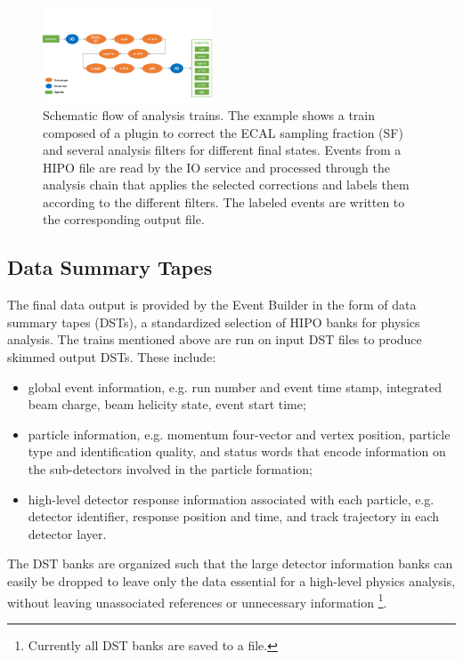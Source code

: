 \begin{figure}
    \includegraphics[width=0.45\textwidth,height=0.2\textheight]{pics/train.pdf}
    \caption{Schematic flow of analysis trains. The example shows a train composed of a plugin to correct the ECAL
      sampling fraction (SF) and several analysis filters for different final states. Events from a HIPO file are read
      by the IO service and processed through the analysis chain that applies the selected corrections and labels them
      according to the different filters. The labeled events are written to the corresponding output file.\label{fig:train}}
\end{figure}

\subsection{Data Summary Tapes}
\label{sec:dsts}

The final data output is provided by the Event Builder in the form of data summary tapes (DSTs), a standardized
selection of HIPO banks for physics analysis. The trains mentioned above are run on input DST files to produce
skimmed output DSTs. These include:

\begin{itemize}
\item global event information, e.g. run number and event time stamp, integrated beam charge, beam helicity state,
  event start time;
\item particle information, e.g. momentum four-vector and vertex position, particle type and identification quality,
  and status words that encode information on the sub-detectors involved in the particle formation;
\item high-level detector response information associated with each particle, e.g. detector identifier, response
  position and time, and track trajectory in each detector layer.
\end{itemize}

\noindent
The DST banks are organized such that the large detector information banks can easily be dropped to leave only
the data essential for a high-level physics analysis, without leaving unassociated references or unnecessary information
\footnote{Currently all DST banks are saved to a file.}. 

